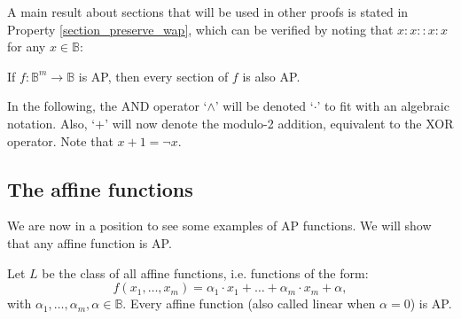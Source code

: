\documentclass[article]{amsart}
\begin{document}
A main result about sections that will be used in other proofs is stated in
Property \ref{section_preserve_wap}, which can be verified by noting that
$x:x::x:x$ for any $x \in \mathbb{B}$:

\begin{proper}\label{section_preserve_wap}
If $f\colon \mathbb{B}^m\to \mathbb{B}$ is AP, then every section of $f$ is
also AP.  \end{proper}

In the following, the AND operator `$\wedge$' will be denoted `$\cdot$' to fit
with an algebraic notation. Also, `$+$' will now denote the modulo-2 addition,
equivalent to the XOR operator. Note that $x + 1 = \neg x$.

\subsection{The affine functions}

We are now in a position to see some examples of AP functions. We will show that
any affine function is AP.

\begin{propos}\label{affine_functions_are_wap}
Let $L$ be the class of all affine functions, i.e. functions of the form:
  $$f(x_1,\ldots , x_m)=\alpha_1\cdot x_1+\ldots +\alpha_m\cdot  x_m+\alpha,$$
  with $\alpha_1,\ldots, \alpha_m,\alpha\in \mathbb{B}$. Every affine function
  (also called linear when $\alpha = 0$) is AP.
\end{propos}
\end{document}

